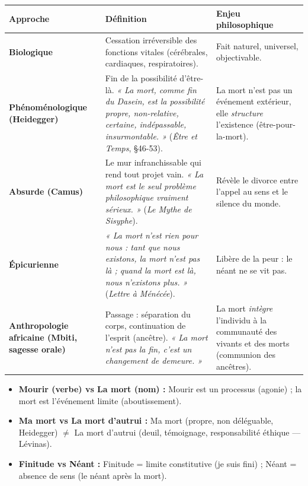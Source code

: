\documentclass[11pt]{article}
\newcommand{\cle}[1]{{\popxbold\color{popdark}#1}}
\begin{document}
\begin{definition}
\begin{center}
\begin{tabularx}{\linewidth}{|l|X|X|}\hline
\textbf{Approche} & \textbf{Définition} & \textbf{Enjeu philosophique} \\ \hline
\textbf{Biologique} & Cessation irréversible des fonctions vitales (cérébrales, cardiaques, respiratoires). & Fait naturel, universel, objectivable. \\ \hline
\textbf{Phénoménologique (Heidegger)} & \cle{Fin} de la possibilité d'être-là. \emph{« La mort, comme fin du Dasein, est la possibilité propre, non-relative, certaine, indépassable, insurmontable. »} (\emph{Être et Temps}, §46-53). & La mort n'est pas un événement extérieur, elle \emph{structure} l'existence (être-pour-la-mort). \\ \hline
\textbf{Absurde (Camus)} & Le \cle{mur} infranchissable qui rend tout projet vain. \emph{« La mort est le seul problème philosophique vraiment sérieux. »} (\emph{Le Mythe de Sisyphe}). & Révèle le divorce entre l'appel au sens et le silence du monde. \\ \hline
\textbf{Épicurienne} & \emph{« La mort n'est rien pour nous : tant que nous existons, la mort n'est pas là ; quand la mort est là, nous n'existons plus. »} (\emph{Lettre à Ménécée}). & Libère de la peur : le néant ne se vit pas. \\ \hline
\textbf{Anthropologie africaine (Mbiti, sagesse orale)} & \cle{Passage} : séparation du corps, continuation de l'esprit (ancêtre). \emph{« La mort n'est pas la fin, c'est un changement de demeure. »} & La mort \emph{intègre} l'individu à la communauté des vivants et des morts (communion des ancêtres). \\ \hline
\end{tabularx}
\end{center}
\end{definition}

\begin{propriete}
\begin{itemize}
    \item \textbf{Mourir (verbe) vs La mort (nom) :} Mourir est un processus (agonie) ; la mort est l'événement limite (aboutissement).
    \item \textbf{Ma mort vs La mort d'autrui :} \cle{Ma mort} (propre, non déléguable, Heidegger) $\neq$ \cle{La mort d'autrui} (deuil, témoignage, responsabilité éthique — Lévinas).
    \item \textbf{Finitude vs Néant :} Finitude = limite constitutive (je suis fini) ; Néant = absence de sens (le néant après la mort).
\end{itemize}
\end{propriete}
\end{document}
